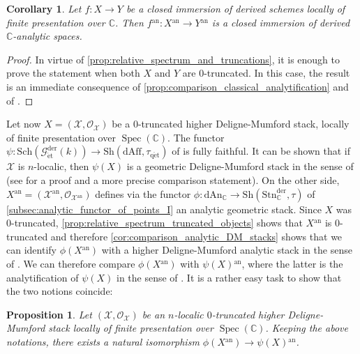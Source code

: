 \documentclass[12pt,a4paper,reqno]{amsart}
\theoremstyle{plain}
\newtheorem{prop}[thm]{Proposition}
\newtheorem{cor}[thm]{Corollary}
\theoremstyle{definition}
\theoremstyle{remark}
\numberwithin{equation}{section}
\begin{document}
\begin{cor}
	Let $f \colon X \to Y$ be a closed immersion of derived schemes locally of finite presentation over $\mathbb C$.
	Then $f{^\mathrm{an}} \colon X{^\mathrm{an}} \to Y{^\mathrm{an}}$ is a closed immersion of derived {$\mathbb C$-analytic\xspace} spaces.
\end{cor}

\begin{proof}
	In virtue of \cref{prop:relative_spectrum_and_truncations}, it is enough to prove the statement when both $X$ and $Y$ are $0$-truncated.
	In this case, the result is an immediate consequence of \cref{prop:comparison_classical_analytification} and of \cite[Expos\'e XII, Proposition 3.2]{SGA1}.
\end{proof}

Let now $X = ({\mathcal X}, {\mathcal O}_{\mathcal X})$ be a $0$-truncated higher {Deligne-Mumford\xspace} stack, locally of finite presentation over $\operatorname{Spec}(\mathbb C)$.
The functor $\psi \colon {\mathrm{Sch}}({{\mathcal G}_{\mathrm{\acute{e}t}}^\mathrm{der}(k)}) \to {\mathrm{Sh}}(\mathrm{dAff}, {\tau_\mathrm{q\acute{e}t}})$ of \cite[Theorem 2.4.1]{DAG-V} is fully faithful.
It can be shown that if ${\mathcal X}$ is $n$-localic, then $\psi(X)$ is a geometric {Deligne-Mumford\xspace} stack in the sense of \cite{HAG-II} (see \cite{Porta_Comparison_2015} for a proof and a more precise comparison statement).
On the other side, $X{^\mathrm{an}} = ({\mathcal X}{^\mathrm{an}}, {\mathcal O}_{{\mathcal X}{^\mathrm{an}}})$ defines via the functor $\phi \colon {\mathrm{dAn}_{\mathbb C}} \to {\mathrm{Sh}}({\mathrm{Stn}^{\mathrm{der}}_{\mathbb C}}, \tau)$ of \cref{subsec:analytic_functor_of_points_I} an analytic geometric stack.
Since $X$ was $0$-truncated, \cref{prop:relative_spectrum_truncated_objects} shows that $X{^\mathrm{an}}$ is $0$-truncated and therefore \cref{cor:comparison_analytic_DM_stacks} shows that we can identify $\phi(X{^\mathrm{an}})$ with a higher {Deligne-Mumford\xspace} analytic stack in the sense of \cite{Porta_Yu_Higher_analytic_stacks_2014}.
We can therefore compare $\phi(X{^\mathrm{an}})$ with $\psi(X){^\mathrm{an}}$, where the latter is the analytification of $\psi(X)$ in the sense of \cite[Â§6.1]{Porta_Yu_Higher_analytic_stacks_2014}.
It is a rather easy task to show that the two notions coincide:

\begin{prop} \label{prop:comparison_analytification_DM_stacks}
	Let $({\mathcal X}, {\mathcal O}_{\mathcal X})$ be an $n$-localic $0$-truncated higher {Deligne-Mumford\xspace} stack locally of finite presentation over $\operatorname{Spec}(\mathbb C)$.
	Keeping the above notations, there exists a natural isomorphism $\phi(X{^\mathrm{an}}) \to \psi(X){^\mathrm{an}}$.
\end{prop}
\end{document}
